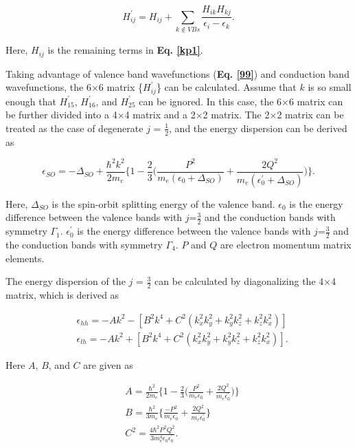\documentclass[a4paper, 12pt, titlepage,oneside,drop]{kthesis}
\begin{document}
\begin{equation} 
 H_{ij}^{'} = H_{ij}+\sum\limits_{k \notin {VBs}} \frac{H_{ik}H_{kj}}{\epsilon_i-\epsilon_k}.
\end{equation}

Here, $H_{ij}$ is the remaining terms in \textbf{Eq. \ref{kp1}}.

Taking advantage of valence band wavefunctions (\textbf{Eq. \ref{99}}) and conduction band wavefunctions, the 6$\times$6 matrix \{$H_{ij}^{'}$\} can be calculated. Assume that $k$ is so small enough that $H_{15}^{'}$, $H_{16}^{'}$,
and $H_{25}^{'}$ can be ignored. In this case, the 6$\times$6 matrix can be further divided into a 4$\times$4 matrix and a 2$\times$2 matrix. The 2$\times$2 matrix can be treated as the case of degenerate $j$ = $\frac{1}{2}$, and 
the energy dispersion can be derived as

\begin{equation}
 \epsilon_{SO} = -\varDelta_{SO} + \frac{\hbar^2 k^2}{2m_e} \Big\{ 1 - \frac{2}{3} \big(\frac{P^2}{m_e(\epsilon_0 + \varDelta_{SO})} + \frac{2Q^2}{m_e(\epsilon_0^{'} + \varDelta_{SO})}\big)  \Big\}.
\end{equation}

Here, $\varDelta_{SO}$ is the spin-orbit splitting energy of the valence band. $\epsilon_0$ is the energy difference between the valence bands with $j$=$\frac{3}{2}$ and the conduction bands with symmetry $\varGamma_1$. 
 $\epsilon_0^{'}$ is the energy difference between the valence bands with $j$=$\frac{3}{2}$ and the conduction bands with symmetry $\varGamma_4$. $P$ and $Q$ are electron momentum matrix elements.

The energy dispersion of the $j$ = $\frac{3}{2}$ can be calculated by diagonalizing the 4$\times$4 matrix, which is derived as

\begin{equation} \begin{split}
& \epsilon_{hh} = -Ak^2-[B^2k^4 + C^2 (k_x^{2}k_y^{2} + k_y^{2}k_z^{2} +k_z^{2}k_x^{2} )] \\
& \epsilon_{lh} = -Ak^2+[B^2k^4 + C^2 (k_x^{2}k_y^{2} + k_y^{2}k_z^{2} +k_z^{2}k_x^{2} )].
 \end{split}
\end{equation}

Here $A$, $B$, and $C$ are given as

\begin{equation}\begin{split}\label{1010}
 & A = \frac{\hbar^2}{2m_e} \Big\{ 1 - \frac{2}{3}\big(\frac{P^2}{m_e{\epsilon_0}} + \frac{2Q^2}{m_e{\epsilon_0^{'}}}\big) \Big\} \\
 & B = \frac{\hbar^2}{3m_e} \Big\{ \frac{-P^2}{m_e{\epsilon_0}} + \frac{2Q^2}{m_e{\epsilon_0^{'}}} \Big\} \\
 & C^2 = \frac{4\hbar^2P^2Q^2}{3m_e^4\epsilon_0\epsilon_0^{'}}.
 \end{split}
\end{equation}
\end{document}
